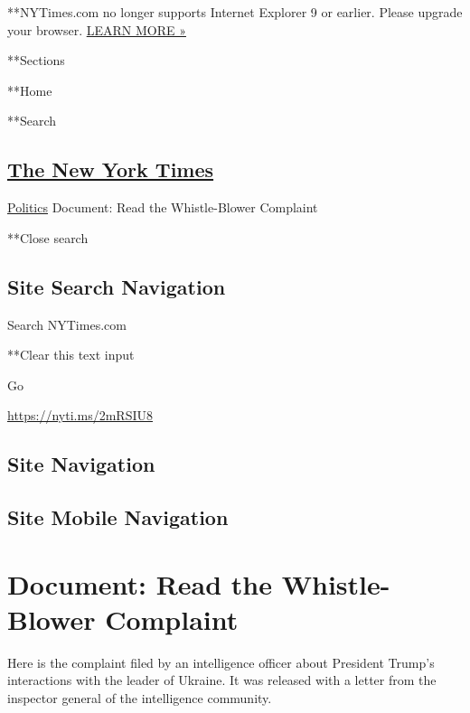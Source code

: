  **NYTimes.com no longer supports Internet Explorer 9 or earlier. Please
upgrade your browser.
\href{http://www.nytimes.com/content/help/site/ie9-support.html}{LEARN
MORE »}

**Sections

**Home

**Search

\hypertarget{the-new-york-times}{%
\subsection{\texorpdfstring{\href{http://www.nytimes.com/}{The New York
Times}}{The New York Times}}\label{the-new-york-times}}

 \href{/section/politics}{Politics} \textbar{}Document: Read the
Whistle-Blower Complaint

**Close search

\hypertarget{site-search-navigation}{%
\subsection{Site Search Navigation}\label{site-search-navigation}}

Search NYTimes.com

**Clear this text input

Go

\url{https://nyti.ms/2mRSIU8}

\hypertarget{site-navigation}{%
\subsection{Site Navigation}\label{site-navigation}}

\hypertarget{site-mobile-navigation}{%
\subsection{Site Mobile Navigation}\label{site-mobile-navigation}}

\hypertarget{document-read-the-whistle-blower-complaint}{%
\section{Document: Read the Whistle-Blower
Complaint}\label{document-read-the-whistle-blower-complaint}}

Here is the complaint filed by an intelligence officer about President
Trump's interactions with the leader of Ukraine. It was released with a
letter from the inspector general of the intelligence community.


